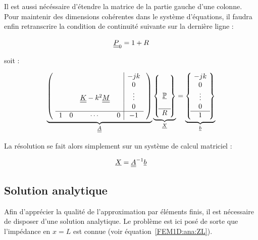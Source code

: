 Il est aussi nécéssaire d'étendre la matrice de la partie gauche d'une colonne. Pour maintenir des dimensions cohérentes
dans le système d'équations, il faudra enfin retranscrire la condition de continuité suivante sur la dernière ligne :

\begin{equation*}
	\underline{\underline{P}}_0 = 1 + R
\end{equation*}

soit :

\begin{equation}
	\underbrace{\left(~
	\begin{array}{cccc|c}
		&&&&-jk\\
		&&&&0\\
		& & \underline{\underline{K}} - k^2\underline{\underline{M}} & &\vdots \\
		&&&&0\\\hline
			1 & 0 & \cdots & 0& -1 \\
	\end{array}
	~\right)}_{\underline{\underline{A}}}
	\underbrace{\left\{~
	\begin{matrix}
		\\
		\\
		\underline{\mathbb{P}}\\
		\\\hline
		R
	\end{matrix}
	~\right\}}_{\underline{X}} = 
	\underbrace{\left\{~
	\begin{matrix}
		-jk\\
		0\\
		\vdots\\
		0\\\hline
		1
	\end{matrix}
	~\right\}}_{\underline{b}}
\end{equation}

La résolution se fait alors simplement sur un système de calcul matriciel :

\begin{equation*}
	\underline{X} = \underline{\underline{A}}^{-1}\underline{b}
\end{equation*}

\subsection{Solution analytique}

Afin d'apprécier la qualité de l'approximation par éléments finis, il est nécessaire de disposer d'une solution
analytique. Le problème est ici posé de sorte que l'impédance en $x=L$ est connue (voir équation~\eqref{FEM1D:ana:ZL}).

